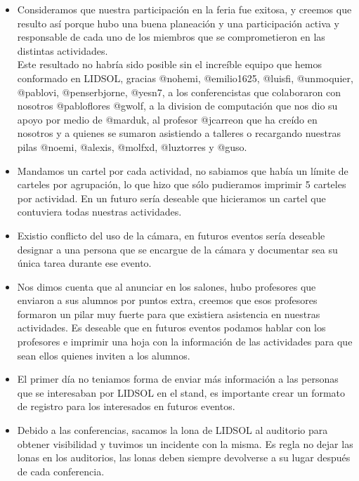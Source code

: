\documentclass[a4paper,11pt]{article}                 %
\begin{document}
    \begin{itemize}
    
    \item Consideramos que nuestra participación en la feria fue exitosa, y creemos que resulto así porque hubo una buena planeación y una participación activa y responsable de cada uno de los miembros que se comprometieron en las distintas actividades. \\Este resultado no habría sido posible sin el increíble equipo que hemos conformado en LIDSOL, gracias @nohemi, @emilio1625, @luisfi, @unmoquier, @pablovi, @penserbjorne, @yesn7, a los conferencistas que colaboraron con nosotros @pabloflores @gwolf, a la division de computación que nos dio su apoyo por medio de @marduk, al profesor @jcarreon que ha creído en nosotros y a quienes se sumaron asistiendo a talleres o recargando nuestras pilas @noemi, @alexis, @molfxd, @luztorres y @guso.
    
    \item Mandamos un cartel por cada actividad, no sabiamos que había un límite de carteles por agrupación, lo que hizo que sólo pudieramos imprimir 5 carteles por actividad. En un futuro sería deseable que hicieramos un cartel que contuviera todas nuestras actividades.
    \item Existio conflicto del uso de la cámara, en futuros eventos sería deseable designar a una persona que se encargue de la cámara y documentar sea su única tarea durante ese evento.
    
    \item Nos dimos cuenta que al anunciar en los salones, hubo profesores que enviaron a sus alumnos por puntos extra, creemos que esos profesores formaron un pilar muy fuerte para que existiera asistencia en nuestras actividades. Es deseable que en futuros eventos podamos hablar con los profesores e imprimir una hoja con la información de las actividades para que sean ellos quienes inviten a los alumnos.
    
    \item El primer día no teniamos forma de enviar más información a las personas que se interesaban por LIDSOL en el stand, es importante crear un formato de registro para los interesados en futuros eventos.
    
    \item Debido a las conferencias, sacamos la lona de LIDSOL al auditorio para obtener visibilidad y tuvimos un incidente con la misma. Es regla no dejar las lonas en los auditorios, las lonas deben siempre devolverse a su lugar después de cada conferencia.
    

\end{itemize}
\end{document}

